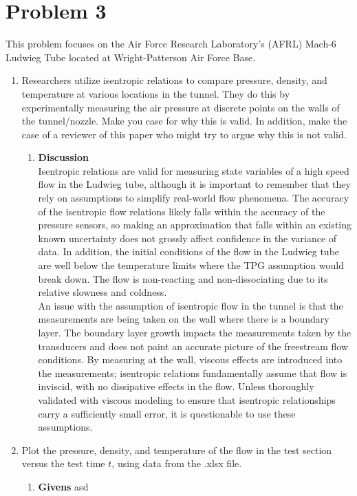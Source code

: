 \documentclass[12pt,letterpaper]{article}
\begin{document}
	\section*{Problem 3}
	This problem focuses on the Air Force Research Laboratory's (AFRL) Mach-6 Ludwieg Tube located at Wright-Patterson Air Force Base. 
	\begin{enumerate}[label=(\alph*)]
		\item Researchers utilize isentropic relations to compare pressure, density, and temperature at various locations in the tunnel. They do this by experimentally measuring the air pressure at discrete points on the walls of the tunnel/nozzle. Make you case for why this is valid. In addition, make the case of a reviewer of this paper who might try to argue why this is not valid.
		\begin{enumerate}[label=\arabic*.]
			\item{\textbf{Discussion}} \\
			Isentropic relations are valid for measuring state variables of a high speed flow in the Ludwieg tube, although it is important to remember that they rely on assumptions to simplify real-world flow phenomena. The accuracy of the isentropic flow relations likely falls within the accuracy of the pressure sensors, so making an approximation that falls within an existing known uncertainty does not grossly affect confidence in the variance of data. In addition, the initial conditions of the flow in the Ludwieg tube are well below the temperature limits where the TPG assumption would break down. The flow is non-reacting and non-dissociating due to its relative slowness and coldness. 
			\\
			An issue with the assumption of isentropic flow in the tunnel is that the measurements are being taken on the wall where there is a boundary layer. The boundary layer growth impacts the measurements taken by the transducers and does not paint an accurate picture of the freestream flow conditions. By measuring at the wall, viscous effects are introduced into the measurements; isentropic relations fundamentally assume that flow is inviscid, with no dissipative effects in the flow. Unless thoroughly validated with viscous modeling to ensure that isentropic relationships carry a sufficiently small error, it is questionable to use these assumptions. %
		\end{enumerate}
		\item Plot the pressure, density, and temperature of the flow in the test section versus the test time $t$, using data from the .xlsx file.
		\begin{enumerate}[label=\arabic*.]
			\item{\textbf{Givens}}
			asd
			

\end{enumerate}
\end{enumerate}
\end{document}

